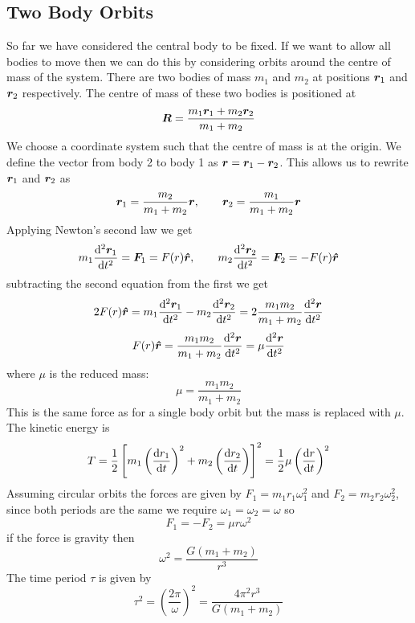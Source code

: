 \documentclass{article}
\begin{document}
    \subsection{Two Body Orbits}
    So far we have considered the central body to be fixed.
    If we want to allow all bodies to move then we can do this by considering orbits around the centre of mass of the system.
    There are two bodies of mass \(m_1\) and \(m_2\) at positions \(\bm{r}_1\) and \(\bm{r}_2\) respectively.
    The centre of mass of these two bodies is positioned at
    \[\bm{R} = \frac{m_1\bm{r}_1 + m_2\bm{r}_2}{m_1 + m_2}\]
    We choose a coordinate system such that the centre of mass is at the origin.
    We define the vector from body 2 to body 1 as \(\bm{r} = \bm{r}_1 - \bm{r}_2\).
    This allows us to rewrite \(\bm{r}_1\) and \(\bm{r}_2\) as
    \[\bm{r}_1 = \frac{m_2}{m_1 + m_2}\bm{r},\qquad \bm{r}_2 = \frac{m_1}{m_1 + m_2}\bm{r}\]
    Applying Newton's second law we get
    \[m_1\dv[2]{\bm{r}_1}{t} = \bm{F}_1 = F(r)\bm{\hat{r}},\qquad m_2\dv[2]{\bm{r}_2}{t} = \bm{F}_2 = -F(r)\bm{\hat{r}}\]
    subtracting the second equation from the first we get
    \[2F(r)\bm{\hat{r}} = m_1\dv[2]{\bm{r}_1}{t} - m_2\dv[2]{\bm{r}_2}{t} = 2\frac{m_1m_2}{m_1 + m_2}\dv[2]{\bm{r}}{t}\]
    \[F(r)\bm{\hat{r}} = \frac{m_1m_2}{m_1 + m_2}\dv[2]{\bm{r}}{t} = \mu\dv[2]{\bm{r}}{t}\]
    where \(\mu\) is the reduced mass:
    \[\mu = \frac{m_1m_2}{m_1 + m_2}\]
    This is the same force as for a single body orbit but the mass is replaced with \(\mu\).
    The kinetic energy is
    \[T = \frac{1}{2}\left[m_1\left(\dv{r_1}{t}\right)^2 + m_2\left(\dv{r_2}{t}\right)\right]^2 = \frac{1}{2}\mu\left(\dv{r}{t}\right)^2\]
    Assuming circular orbits the forces are given by \(F_1 = m_1r_1\omega_1^2\) and \(F_2 = m_2r_2\omega_2^2\), since both periods are the same we require \(\omega_1 = \omega_2 = \omega\) so
    \[F_1 = -F_2 = \mu r\omega^2\]
    if the force is gravity then
    \[\omega^2 = \frac{G(m_1 + m_2)}{r^3}\]
    The time period \(\tau\) is given by
    \[\tau^2 = \left(\frac{2\pi}{\omega}\right)^2 = \frac{4\pi^2r^3}{G(m_1 + m_2)}\]
    
\end{document}
